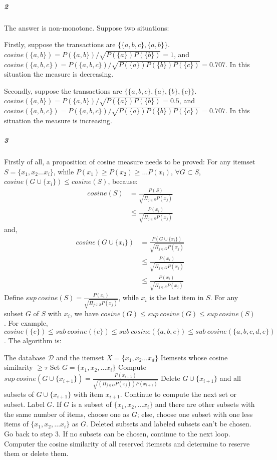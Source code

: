 \documentclass[22pt]{article}
\begin{document}
		\subparagraph{2} The answer is non-monotone. Suppose two situations: 

		Firstly, suppose the transactions are $\{\{a,b,c\},\{a,b\}\}$. $cosine(\{a,b\}) = P(\{a,b\})/ \sqrt{P(\{a\})P(\{b\})} = 1$, and $cosine(\{a,b,c\}) = P(\{a,b,c\})/ \sqrt{P(\{a\})P(\{b\})P(\{c\})} = 0.707$. In this situation the measure is decreasing.

		Secondly, suppose the transactions are $\{\{a,b,c\},\{a\},\{b\},\{c\}\}$. $cosine(\{a,b\}) = P(\{a,b\})/ \sqrt{P(\{a\})P(\{b\})} = 0.5$, and $cosine(\{a,b,c\}) = P(\{a,b,c\})/ \sqrt{P(\{a\})P(\{b\})P(\{c\})} = 0.707 $. In this situation the measure is increasing.



 		\subparagraph{3} Firstly of all, a proposition of cosine measure needs to be proved: For any itemset $S = \{x_1,x_2\dots x_i\}$, while $P(x_1) \geq P(x_2) \geq \dots P(x_i)$, $\forall G \subset S $, $cosine(G\cup\{x_i\})\leq cosine(S)$, because:
 		\begin{align}
 		 cosine(S) & = \frac{P(S)}{\sqrt{\Pi_{j\in S}P(x_j)}}\\
 		 & \leq \frac{P(x_i)}{\sqrt{\Pi_{j\in S}P(x_j)}}
 		\end{align}
 		and,
 		\begin{align}
 		cosine(G\cup\{x_i\}) &  = \frac{P(G\cup\{x_i\})}{\sqrt{\Pi_{j\in G}P(x_j)}}\\ 
 		& \leq \frac{P(x_i)}{\sqrt{\Pi_{j\in G}P(x_j)}}\\
 		& \leq \frac{P(x_i)}{\sqrt{\Pi_{j\in S}P(x_j)}}
 		\end{align}
 		Define $sup\ cosine(S) = \frac{P(x_i)}{\sqrt{\Pi_{j\in S}P(x_j)}}$, while $x_i$ is the last item in $S$. For any subset $G$ of $S$ with $x_i$, we have $cosine(G) \leq sup\ cosine(G) \leq sup\ cosine(S)$. For example, $cosine(\{e\}) \leq sub\ cosine(\{e\}) \leq sub\ cosine(\{a,b,e\}) \leq sub\ cosine(\{a,b,c,d,e\})$. The algorithm is:


 		\begin{algorithm}
			\begin{algorithmic}[1]
			\REQUIRE The database $\mathcal{D}$ and the itemset $X = \{x_1,x_2\dots x_d\}$
			\ENSURE Itemsets whose cosine similarity $\geq \tau$
			\STATE Set $G = \{x_1, x_2,\dots x_i\}$
			\STATE Compute $sup\ cosine(G\cup \{x_{i+1}\}) = \frac{P(x_{i+1})}{\sqrt{(\Pi_{j\in G}P(x_j))P(x_{i+1})}}$
			\STATE Delete $G\cup \{x_{i+1}\}$ and all subsets of $G\cup \{x_{i+1}\}$ with item $x_{i+1}$. Continue to compute the next set or subset. 
			\ELSE
			\STATE Label $G$.
			\ENDIF
			\STATE If $G$ is a subset of $\{x_1, x_2,\dots x_i\}$ and there are other subsets with the same number of items, choose one as $G$; else, choose one subset with one less items of $\{x_1, x_2,\dots x_i\}$  as $G$. Deleted subsets and labeled subsets can't be chosen. Go back to step 3. If no subsets can be chosen, continue to the next loop.
			\ENDFOR
			\STATE Computer the cosine similarity of all reserved itemsets and determine to reserve them or delete them.
			\end{algorithmic}
			\end{algorithm}
\end{document}

